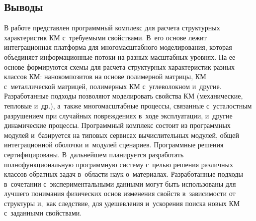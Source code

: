 \begin{multicols}{2}
\section{Выводы}

\vspace*{-2pt}

     В работе представлен программный комплекс для расчета структурных 
характеристик КМ с~тре\-бу\-емы\-ми свойствами. В~его 
основе лежит интеграционная плат\-фор\-ма для многомасштабного моделирования, 
которая объединяет информационные потоки на разных мас\-штаб\-ных уровнях. На 
ее основе формируются схемы для рас\-че\-та структурных характеристик разных 
клас\-сов КМ: нанокомпозитов на основе полимерной 
мат\-ри\-цы, КМ с~металлической мат\-ри\-цей, полимерных 
КМ с~углеволокном и~другие. Разработанные подходы 
поз\-во\-ля\-ют моделировать свойства КМ (механические, 
теп\-ло\-вые и~др.), а~так\-же многомасштабные процессы, связанные с~усталостным 
разрушением при случайных по\-вреж\-де\-ни\-ях в~ходе эксплуатации, и~другие 
динамические процессы. Программный комплекс со\-сто\-ит из программных 
модулей и~базируется на типовых сер\-ви\-сах вы\-чис\-ли\-тель\-ных модулей, общей 
интеграционной оболочки и~модулей сценариев. Про\-грам\-мные решения 
сертифицированы. В~дальнейшем планируется раз\-ра\-бо\-тать 
полнофункциональную про\-грам\-мную сис\-те\-му с~целью решения различных 
классов обратных задач в~об\-ласти наук о~материалах. Разработанные подходы 
в~сочетании с~экспериментальными данными могут быть использованы для 
лучшего понимания физических основ изменения свойств в~за\-ви\-си\-мости от 
струк\-ту\-ры и,~как след\-ст\-вие, для уде\-шев\-ле\-ния и~уско\-ре\-ния поиска новых 
КМ с~заданными свойствами.

\vspace*{-6pt}
   
{\small\frenchspacing
 {%
 \begin{thebibliography}{9}
 
 \vspace*{-2pt}
   

\end{thebibliography}}}
\end{multicols}
